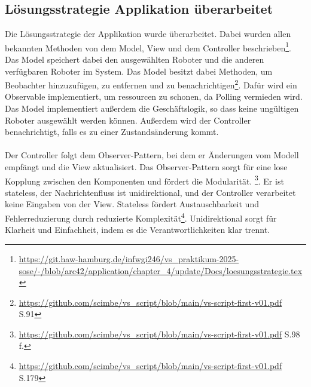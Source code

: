 \documentclass{article}
\begin{document}
\subsection{Lösungsstrategie Applikation überarbeitet}
Die Lösungsstrategie der Applikation wurde überarbeitet. Dabei wurden allen bekannten Methoden von dem Model, View und dem Controller beschrieben\footnote{\url{https://git.haw-hamburg.de/infwgi246/vs_praktikum-2025-sose/-/blob/arc42/application/chapter_4/update/Docs/loesungsstrategie.tex}}. 
Das Model speichert dabei den ausgewählten Roboter und die anderen verfügbaren Roboter im System. Das Model besitzt dabei Methoden, um Beobachter hinzuzufügen, zu entfernen und zu benachrichtigen\footnote{\url{https://github.com/scimbe/vs_script/blob/main/vs-script-first-v01.pdf} S.91}. 
Dafür wird ein Observable implementiert, um ressourcen zu schonen, da Polling vermieden wird.  
Das Model implementiert außerdem die Geschäftslogik, so dass keine ungültigen Roboter ausgewählt werden können. Außerdem wird der Controller benachrichtigt, falls es zu einer Zustandsänderung kommt.
\\\\
Der Controller folgt dem Observer-Pattern, bei dem er Änderungen vom Modell empfängt und die View aktualisiert. 
Das Observer-Pattern sorgt für eine lose Kopplung zwischen den Komponenten und fördert die Modularität.
\footnote{\url{https://github.com/scimbe/vs_script/blob/main/vs-script-first-v01.pdf} S.98 f.}.
Er ist stateless, der Nachrichtenfluss ist unidirektional, und der Controller verarbeitet keine Eingaben von der View.
Stateless fördert Austauschbarkeit und Fehlerreduzierung durch reduzierte Komplexität\footnote{\url{https://github.com/scimbe/vs_script/blob/main/vs-script-first-v01.pdf} S.179}.
Unidirektional sorgt für Klarheit und Einfachheit, indem es die Verantwortlichkeiten klar trennt.
\end{document}
